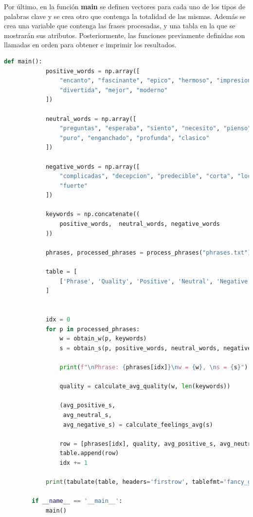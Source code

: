 \documentclass{article}
\begin{document}
    \newpage

    Por último, en la función \textbf{main} se definen vectores para cada uno de los tipos de palabras clave y se crea otro que contenga la totalidad de las mismas. Además se crea una variable que contenga las frases procesadas, y una tabla en la que se mostrarán sus atributos. Posteriormente, las funciones previamente definidas son llamadas en orden para obtener e imprimir los resultados.

    \begin{lstlisting}[language=Python]
        def main():
            positive_words = np.array([
                "encanto", "fascinante", "epico", "hermoso", "impresionante",
                "divertida", "mejor", "moderno"
            ])

            neutral_words = np.array([
                "preguntas", "esperaba", "siento", "necesito", "pienso", "piensa",
                "puro", "enganchado", "profunda", "clasico"
            ])

            negative_words = np.array([
                "complicadas", "decepcion", "predecible", "corta", "locura", "lloro",
                "fuerte"
            ])

            keywords = np.concatenate((
                positive_words,  neutral_words, negative_words
            ))

            phrases, processed_phrases = process_phrases("phrases.txt")

            table = [
                ['Phrase', 'Quality', 'Positive', 'Neutral', 'Negative']
            ]


            idx = 0
            for p in processed_phrases:
                w = obtain_w(p, keywords)
                s = obtain_s(p, positive_words, neutral_words, negative_words)

                print(f"\nPhrase: {phrases[idx]}\nw = {w}, \ns = {s}")

                quality = calculate_avg_quality(w, len(keywords))

                (avg_positive_s,
                 avg_neutral_s,
                 avg_negative_s) = calculate_feelings_avg(s)

                row = [phrases[idx], quality, avg_positive_s, avg_neutral_s, avg_negative_s]
                table.append(row)
                idx += 1

            print(tabulate(table, headers='firstrow', tablefmt='fancy_grid'))

        if __name__ == '__main__':
            main()
    \end{lstlisting}
\end{document}
